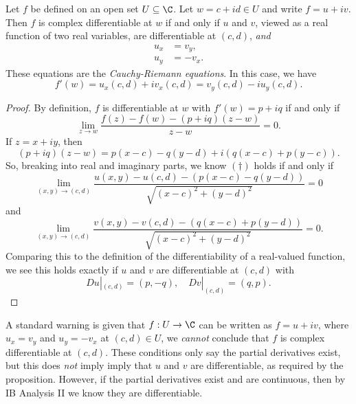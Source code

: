\documentclass[a4paper]{article}
\begin{document}
\begin{prop}
  Let $f$ be defined on an open set $U \subseteq \C$. Let $w = c + id \in U$ and write $f = u + iv$. Then $f$ is complex differentiable at $w$ if and only if $u$ and $v$, viewed as a real function of two real variables, are differentiable at $(c, d)$, \emph{and}
  \begin{align*}
    u_x &= v_y,\\
    u_y &= -v_x.
  \end{align*}
  These equations are the \emph{Cauchy-Riemann equations}. In this case, we have
  \[
    f'(w) = u_x(c, d) + iv_x(c, d) = v_y(c, d) -i u_y(c, d).
  \]
\end{prop}

\begin{proof}
  By definition, $f$ is differentiable at $w$ with $f'(w) = p + iq$ if and only if
  \[
    \lim_{z \to w} \frac{f(z) - f(w) - (p + iq)(z - w)}{z - w} = 0. \tag{$\dagger$}
  \]
  If $z = x + iy$, then
  \[
    (p + iq) (z - w) = p(x - c) - q(y - d) + i(q(x - c) + p (y - c)).
  \]
  So, breaking into real and imaginary parts, we know $(\dagger)$ holds if and only if
  \[
    \lim_{(x, y) \to (c, d)} \frac{u(x, y) - u(c, d) - (p(x - c) - q(y - d))}{\sqrt{(x - c)^2 + (y - d)^2}} = 0
  \]
  and
  \[
    \lim_{(x, y) \to (c, d)} \frac{v(x, y) - v(c, d) - (q(x - c) + p(y - d))}{\sqrt{(x - c)^2 + (y - d)^2}} = 0.
  \]
  Comparing this to the definition of the differentiability of a real-valued function, we see this holds exactly if $u$ and $v$ are differentiable at $(c, d)$ with
  \[
    Du|_{(c, d)} = (p, -q),\quad Dv|_{(c, d)} = (q, p).
  \]
\end{proof}
A standard warning is given that $f: U \to \C$ can be written as $f = u + iv$, where $u_x = v_y$ and $u_y = -v_x$ at $(c, d) \in U$, we \emph{cannot} conclude that $f$ is complex differentiable at $(c, d)$. These conditions only say the partial derivatives exist, but this does \emph{not} imply imply that $u$ and $v$ are differentiable, as required by the proposition. However, if the partial derivatives exist and are continuous, then by IB Analysis II we know they are differentiable.
\end{document}
